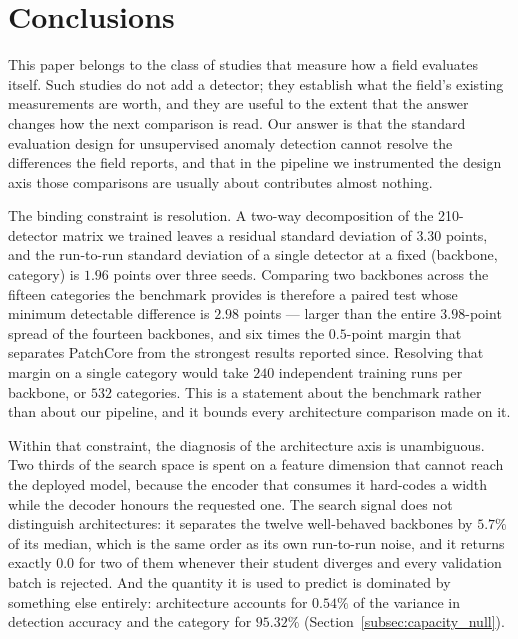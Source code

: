
\section{Conclusions}
\label{sec:conclusion}

This paper belongs to the class of studies that measure how a field evaluates
itself. Such studies do not add a detector; they establish what the field's
existing measurements are worth, and they are useful to the extent that the
answer changes how the next comparison is read. Our answer is that the standard
evaluation design for unsupervised anomaly detection cannot resolve the
differences the field reports, and that in the pipeline we instrumented the
design axis those comparisons are usually about contributes almost nothing.

The binding constraint is resolution. A two-way decomposition of the 210-detector
matrix we trained leaves a residual standard deviation of $3.30$ points, and the
run-to-run standard deviation of a single detector at a fixed (backbone,
category) is $1.96$ points over three seeds. Comparing two backbones across the
fifteen categories the benchmark provides is therefore a paired test whose minimum
detectable difference is $2.98$ points --- larger than the entire $3.98$-point
spread of the fourteen backbones, and six times the $0.5$-point margin that
separates PatchCore from the strongest results reported since. Resolving that
margin on a single category would take $240$ independent training runs per
backbone, or $532$ categories. This is a statement about the benchmark rather than
about our pipeline, and it bounds every architecture comparison made on it.

Within that constraint, the diagnosis of the architecture axis is unambiguous.
Two thirds of the search space is spent on a feature dimension that cannot reach
the deployed model, because the encoder that consumes it hard-codes a width while
the decoder honours the requested one. The search signal does not distinguish
architectures: it separates the twelve well-behaved backbones by $5.7\%$ of its
median, which is the same order as its own run-to-run noise, and it returns
exactly $0.0$ for two of them whenever their student diverges and every validation
batch is rejected. And the quantity it is used to predict is dominated by
something else entirely: architecture accounts for $0.54\%$ of the variance in
detection accuracy and the category for $95.32\%$
(Section~\ref{subsec:capacity_null}).

